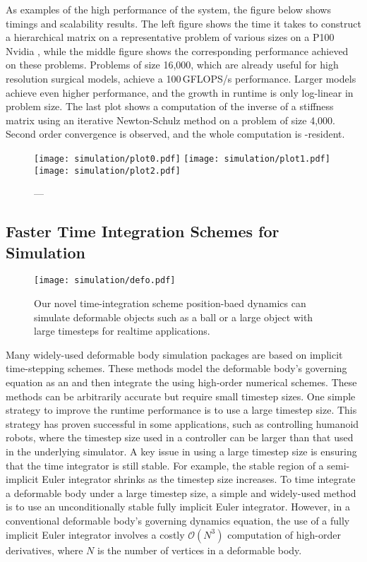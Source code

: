 As examples of the high performance of the system, the figure below shows  timings and scalability results. The left figure shows the time it takes to construct a hierarchical matrix on a representative problem of various sizes on a P100 Nvidia , while the middle figure shows the corresponding performance achieved on these problems. Problems of size 16,000, which are already useful for high resolution surgical models, achieve a 100\,GFLOPS/s performance. Larger models achieve even higher performance, and the growth in runtime is only log-linear in problem size. The last plot shows a computation of the inverse of a stiffness matrix using an iterative Newton-Schulz method on a problem of size 4,000. Second order convergence is observed, and the whole computation is -resident.

\begin{figure}
  \centering%
  \texttt{[image: simulation/plot0.pdf]}
  \hfill%
  \texttt{[image: simulation/plot1.pdf]}
  \hfill%
  \texttt{[image: simulation/plot2.pdf]}
  \vspace{-15ex}
  \caption{---}\label{fig:plots}
\end{figure}

\subsection{Faster Time Integration Schemes for Simulation}
\begin{figure}[ht]
  \centering
  \texttt{[image: simulation/defo.pdf]}
  \caption{Our novel time-integration scheme position-baed dynamics can simulate deformable objects such as a ball or a large object with large timesteps for realtime applications.}\label{fig:pbdd}
\end{figure}

Many widely-used deformable body simulation packages are based on implicit time-stepping schemes. These methods model the deformable body's governing equation as an  and then integrate the  using high-order numerical schemes. These methods can be arbitrarily accurate but require small timestep sizes. One simple strategy to improve the runtime performance is to use a large timestep size. This strategy has proven successful in some applications, such as controlling humanoid robots, where the timestep size used in a controller can be larger than that used in the underlying simulator. A key issue in using a large timestep size is ensuring that the time integrator is still stable. For example, the stable region of a semi-implicit Euler integrator shrinks as the timestep size increases. To time integrate a deformable body under a large timestep size, a simple and widely-used method is to use an unconditionally stable fully implicit Euler integrator. However, in a conventional deformable body's governing dynamics equation, the use of a fully implicit Euler integrator involves a costly $\mathcal{O}(N^3)$ computation of high-order derivatives, where $N$ is the number of vertices in a deformable body.

